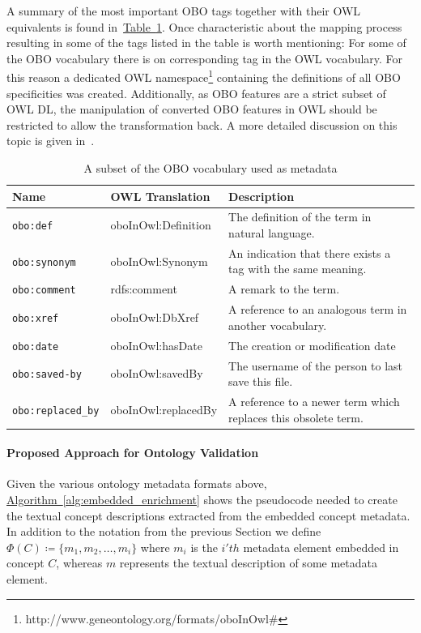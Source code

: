 \documentclass[draft,final]{vutinfth} %
\begin{document}
A summary of the most important OBO tags together with their OWL equivalents is found in~\hyperref[table:obo]{Table~\ref*{table:obo}}. Once characteristic about the mapping process resulting in some of the tags listed in the table is worth mentioning: For some of the OBO vocabulary there is on corresponding tag in the OWL vocabulary. For this reason a dedicated OWL namespace\footnote{http://www.geneontology.org/formats/oboInOwl\#} containing the definitions of all OBO specificities was created. Additionally, as OBO features are a strict subset of OWL DL, the manipulation of converted OBO features in OWL should be restricted to allow the transformation back. A more detailed discussion on this topic is given in~\cite{tirmizi2011, tirmizi2006}.

\begingroup
\renewcommand{\arraystretch}{2}
\begin{table}
	\begin{tabularx}{\textwidth}{l|l|X}
		\textbf{Name} & \textbf{OWL Translation} & \textbf{Description} \\
		\hline
        \texttt{obo:def} & oboInOwl:Definition & The definition of the term in natural language.\\
		\texttt{obo:synonym} & oboInOwl:Synonym & An indication that there exists a tag with the same meaning.\\
		\texttt{obo:comment} & rdfs:comment & A remark to the term. \\
		\texttt{obo:xref} & oboInOwl:DbXref & A reference to an analogous term in another vocabulary.\\
		\texttt{obo:date} & oboInOwl:hasDate & The creation or modification date\\
		\texttt{obo:saved-by} & oboInOwl:savedBy & The username of the person to last save this file.\\
		\texttt{obo:replaced\_by} & oboInOwl:replacedBy & A reference to a newer term which replaces this obsolete term.\\
	\end{tabularx}
	\caption{A subset of the OBO vocabulary used as metadata}
	\label{table:obo}
\end{table}
\endgroup

\paragraph{Proposed Approach for Ontology Validation} Given the various ontology metadata formats above, \hyperref[alg:embedded_enrichment]{Algorithm~\ref*{alg:embedded_enrichment}} shows the pseudocode needed to create the textual concept descriptions extracted from the embedded concept metadata. In addition to the notation from the previous Section we define $\Phi(C) \coloneqq \{m_1, m_2, \ldots, m_i \}$ where $m_i$ is the $i'th$ metadata element embedded in concept $C$, whereas $m$ represents the textual description of some metadata element.
\end{document}
